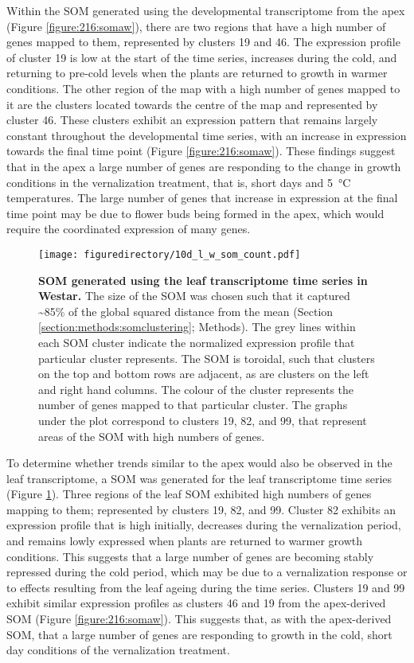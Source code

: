 \documentclass[12pt,]{book}
\begin{document}
Within the SOM generated using the developmental transcriptome from the
apex (Figure \ref{figure:216:somaw}), there are two regions that have a
high number of genes mapped to them, represented by clusters 19 and 46.
The expression profile of cluster 19 is low at the start of the time
series, increases during the cold, and returning to pre-cold levels when
the plants are returned to growth in warmer conditions. The other region
of the map with a high number of genes mapped to it are the clusters
located towards the centre of the map and represented by cluster 46.
These clusters exhibit an expression pattern that remains largely
constant throughout the developmental time series, with an increase in
expression towards the final time point (Figure \ref{figure:216:somaw}).
These findings suggest that in the apex a large number of genes are
responding to the change in growth conditions in the vernalization
treatment, that is, short days and 5~°C temperatures. The large number
of genes that increase in expression at the final time point may be due
to flower buds being formed in the apex, which would require the
coordinated expression of many genes.

\begin{figure}[htbp]
\centering
\texttt{[image: figuredirectory/10d\_l\_w\_som\_count.pdf]}
\caption{\textbf{SOM generated using the leaf transcriptome time series
in Westar.} The size of the SOM was chosen such that it captured
\textasciitilde{}85\% of the global squared distance from the mean
(Section \ref{section:methods:somclustering}; Methods). The grey lines
within each SOM cluster indicate the normalized expression profile that
particular cluster represents. The SOM is toroidal, such that clusters
on the top and bottom rows are adjacent, as are clusters on the left and
right hand columns. The colour of the cluster represents the number of
genes mapped to that particular cluster. The graphs under the plot
correspond to clusters 19, 82, and 99, that represent areas of the SOM
with high numbers of genes.}\label{figure:217:somlw}
\end{figure}

To determine whether trends similar to the apex would also be observed
in the leaf transcriptome, a SOM was generated for the leaf
transcriptome time series (Figure \ref{figure:217:somlw}). Three regions
of the leaf SOM exhibited high numbers of genes mapping to them;
represented by clusters 19, 82, and 99. Cluster 82 exhibits an
expression profile that is high initially, decreases during the
vernalization period, and remains lowly expressed when plants are
returned to warmer growth conditions. This suggests that a large number
of genes are becoming stably repressed during the cold period, which may
be due to a vernalization response or to effects resulting from the leaf
ageing during the time series. Clusters 19 and 99 exhibit similar
expression profiles as clusters 46 and 19 from the apex-derived SOM
(Figure \ref{figure:216:somaw}). This suggests that, as with the
apex-derived SOM, that a large number of genes are responding to growth
in the cold, short day conditions of the vernalization treatment.
\end{document}
